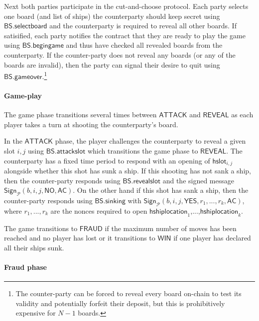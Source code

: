 \documentclass{llncs}
\newcommand{\instantiatedno}{\mathsf{NO}}
\newcommand{\instantiatedyes}{\mathsf{YES}}
\newcommand{\gameattack}{\mathsf{ATTACK}}
\newcommand{\gamereveal}{\mathsf{REVEAL}}
\newcommand{\gamewinner}{\mathsf{WIN}}
\newcommand{\gamefraud}{\mathsf{FRAUD}}
\newcommand{\hslot}{\mathsf{hslot}}
\newcommand{\hshiplocation}{\mathsf{hshiplocation}}
\newcommand{\participant}{\mathcal{P}}
\newcommand{\sign}{\mathsf{Sign}}
\newcommand{\battleshipfraud}{\mathsf{BS.fraud}}
\newcommand{\battleshipattackslot}{\mathsf{BS.attackslot}}
\newcommand{\battleshipbegin}{\mathsf{BS.begingame}}
\newcommand{\battleshipselectboard}{\mathsf{BS.selectboard}}
\newcommand{\battleshiprevealslot}{\mathsf{BS.revealslot}}
\newcommand{\battleshipsinking}{\mathsf{BS.sinking}}
\newcommand{\battleshipgameover}{\mathsf{BS.gameover}}
\newcommand{\appcontract}{\mathsf{AC}}
\begin{document}
Next both parties participate in the cut-and-choose protocol.
Each party selects one board (and list of ships) the counterparty should keep secret using $\battleshipselectboard$ and the counterparty is required to reveal all other boards. 
If satisified, each party notifies the contract that they are ready to play the game using $\battleshipbegin$ and thus have checked all revealed boards from the counterparty. 
If the counter-party does not reveal any boards (or any of the boards are invalid), then the party can signal their desire to quit  using $\battleshipgameover$.\footnote{The counter-party can be forced to reveal every board on-chain to test its validity and potentially forfeit their deposit, but this is prohibitively expensive for $N-1$ boards.}

\paragraph{Game-play} The game phase transitions several times between $\gameattack$ and $\gamereveal$ as each player takes a turn at shooting the counterparty's board. 

In the $\gameattack$ phase, the player challenges the counterparty to reveal a given slot $i,j$ using $\battleshipattackslot$ which transitions the game phase to $\gamereveal$. 
The counterparty has a fixed time period to respond with an opening of $\hslot_{i,j}$ alongside whether this shot has sunk a ship.
If this shooting has not sank a ship, then the counter-party responds using $\battleshiprevealslot$ and the signed message $\sign_{\participant}(b, i, j, \instantiatedno, \appcontract)$.
On the other hand if this shot has sank a ship, then the counter-party responds using $\battleshipsinking$ with
$\sign_{\participant}(b, i, j, \instantiatedyes, r_{1},...,r_{k}, \appcontract)$, where $r_{1},...,r_{k}$ are the nonces required to open $\hshiplocation_{1}$,...,$\hshiplocation_{k}$. 

The game transitions to $\gamefraud$ if the maximum number of moves has been reached and no player has lost or it transitions to $\gamewinner$ if one player has declared all their ships sunk. 

\paragraph{Fraud phase} 
\end{document}

